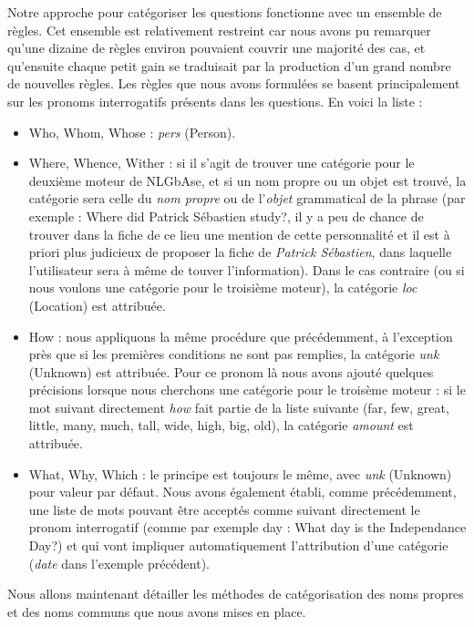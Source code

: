 \documentclass[10pt,a4paper]{article}
\begin{document}
\par Notre approche pour catégoriser les questions fonctionne avec un ensemble de règles. Cet ensemble est relativement restreint car nous avons pu remarquer qu'une dizaine de règles environ pouvaient couvrir une majorité des cas, et qu'ensuite chaque petit gain se traduisait par la production d'un grand nombre de nouvelles règles. Les règles que nous avons formulées se basent principalement sur les pronoms interrogatifs présents dans les questions. En voici la liste : 
\begin{itemize}
\item Who, Whom, Whose : \emph{pers} (Person).
\item Where, Whence, Wither : si il s'agit de trouver une catégorie pour le deuxième moteur de NLGbAse, et si un nom propre ou un objet est trouvé, la catégorie sera celle du \emph{nom propre} ou de l'\emph{objet} grammatical de la phrase (par exemple : \og{}Where did Patrick Sébastien study?\fg{}, il y a peu de chance de trouver dans la fiche de ce lieu une mention de cette personnalité et il est à priori plus judicieux de proposer la fiche de \emph{Patrick Sébastien}, dans laquelle l'utilisateur sera à même de touver l'information). Dans le cas contraire (ou si nous voulons une catégorie pour le troisième moteur), la catégorie \emph{loc} (Location) est attribuée.
\item How : nous appliquons la même procédure que précédemment, à l'exception près que si les premières conditions ne sont pas remplies, la catégorie \emph{unk} (Unknown) est attribuée. Pour ce pronom là nous avons ajouté quelques précisions lorsque nous cherchons une catégorie pour le troisème moteur : si le mot suivant directement \emph{how} fait partie de la liste suivante (far, few, great, little, many, much, tall, wide, high, big, old), la catégorie \emph{amount} est attribuée.
\item What, Why, Which : le principe est toujours le même, avec \emph{unk} (Unknown) pour valeur par défaut. Nous avons également établi, comme précédemment, une liste de mots pouvant être acceptés comme suivant directement le pronom interrogatif (comme par exemple day : \og{}What day is the Independance Day?\fg{}) et qui vont impliquer automatiquement l'attribution d'une catégorie (\emph{date} dans l'exemple précédent).
\end{itemize}
Nous allons maintenant détailler les méthodes de catégorisation des noms propres et des noms communs que nous avons mises en place.


\end{document}
